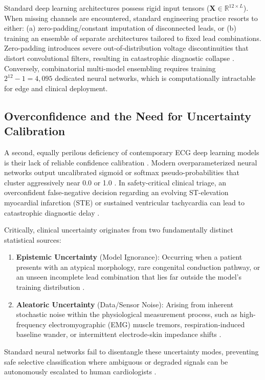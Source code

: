 \documentclass[journal,11pt,draftclsnofoot,onecolumn]{IEEEtran}
\begin{document}
Standard deep learning architectures possess rigid input tensors ($\mathbf{X} \in \mathbb{R}^{12 \times L}$). When missing channels are encountered, standard engineering practice resorts to either: (a) zero-padding/constant imputation of disconnected leads, or (b) training an ensemble of separate architectures tailored to fixed lead combinations. Zero-padding introduces severe out-of-distribution voltage discontinuities that distort convolutional filters, resulting in catastrophic diagnostic collapse \cite{ref_15}. Conversely, combinatorial multi-model ensembling requires training $2^{12} - 1 = 4,095$ dedicated neural networks, which is computationally intractable for edge and clinical deployment.

\subsection{Overconfidence and the Need for Uncertainty Calibration}
A second, equally perilous deficiency of contemporary ECG deep learning models is their lack of reliable confidence calibration \cite{ref_16}. Modern overparameterized neural networks output uncalibrated sigmoid or softmax pseudo-probabilities that cluster aggressively near 0.0 or 1.0 \cite{ref_17}. In safety-critical clinical triage, an overconfident false-negative decision regarding an evolving ST-elevation myocardial infarction (STE) or sustained ventricular tachycardia can lead to catastrophic diagnostic delay \cite{ref_18}. 

Critically, clinical uncertainty originates from two fundamentally distinct statistical sources:
\begin{enumerate}
    \item \textbf{Epistemic Uncertainty} (Model Ignorance): Occurring when a patient presents with an atypical morphology, rare congenital conduction pathway, or an unseen incomplete lead combination that lies far outside the model's training distribution \cite{ref_19}.
    \item \textbf{Aleatoric Uncertainty} (Data/Sensor Noise): Arising from inherent stochastic noise within the physiological measurement process, such as high-frequency electromyographic (EMG) muscle tremors, respiration-induced baseline wander, or intermittent electrode-skin impedance shifts \cite{ref_20}.
\end{enumerate}
Standard neural networks fail to disentangle these uncertainty modes, preventing safe selective classification where ambiguous or degraded signals can be autonomously escalated to human cardiologists \cite{ref_21,ref_22}.
\end{document}
